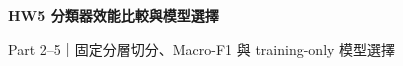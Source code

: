 \documentclass[11pt,a4paper]{article}
\begin{document}

\begin{center}
  {\LARGE\bfseries\color{darkaccent} HW5 分類器效能比較與模型選擇}\par
  \vspace{0.25em}
  {\small Part 2--5｜固定分層切分、Macro-F1 與 training-only 模型選擇}
\end{center}
\vspace{-0.6em}






\end{document}
